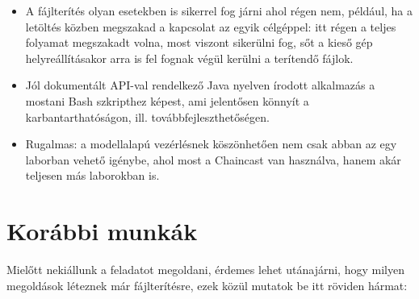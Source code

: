 \begin{itemize}
  \item A fájlterítés olyan esetekben is sikerrel fog járni ahol régen nem, például, ha a letöltés közben megszakad a kapcsolat az egyik célgéppel: itt régen a teljes folyamat megszakadt volna, most viszont sikerülni fog, sőt a kieső gép helyreállításakor arra is fel fognak végül kerülni a terítendő fájlok.
  \item Jól dokumentált API-val rendelkező Java nyelven írodott alkalmazás a mostani Bash szkripthez képest, ami jelentősen könnyít a karbantarthatóságon, ill. továbbfejleszthetőségen.
  \item Rugalmas: a modellalapú vezérlésnek köszönhetően nem csak abban az egy laborban vehető igénybe, ahol most a Chaincast van használva, hanem akár teljesen más laborokban is.
\end{itemize}

\section{Korábbi munkák}
Mielőtt nekiállunk a feladatot megoldani, érdemes lehet utánajárni, hogy milyen megoldások léteznek már fájlterítésre, ezek közül mutatok be itt röviden hármat:

